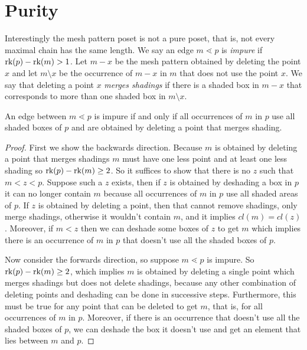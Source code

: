 \documentclass[11pt,a4paper,oneside]{article}
\begin{document}
\section{Purity}

Interestingly the mesh pattern poset is not a pure poset, that is, not every
maximal chain has the same length. We say an edge $m\lessdot p$ is \emph{impure}
if $\operatorname{\textrm{rk}}(p)-\operatorname{\textrm{rk}}(m)>1$. Let $m-x$ be the mesh pattern obtained by deleting the
point $x$ and let $m\setminus x$ be the occurrence of $m-x$ in $m$ that does not
use the point $x$. We say that deleting a point $x$ \emph{merges shadings} if
there is a shaded box in $m-x$ that corresponds to more than one shaded box in
$m\setminus x$.

\begin{lem}\label{lem:impureEdge}
An edge between $m\lessdot p$ is impure if and only if all occurrences of $m$ in
$p$ use all shaded boxes of $p$ and are obtained by deleting a point that merges
shading.
\begin{proof}
First we show the backwards direction. Because $m$ is obtained by deleting a
point that merges shadings $m$ must have one less point and at least one less
shading so $\operatorname{\textrm{rk}}(p)-\operatorname{\textrm{rk}}(m)\ge2$. So it suffices to show that there is no $z$ such
that $m<z<p$. Suppose such a $z$ exists, then if $z$ is obtained by deshading a
box in $p$ it can no longer contain $m$ because all occurrences of $m$ in $p$
use all shaded areas of $p$. If $z$ is obtained by deleting a point, then that
cannot remove shadings, only merge shadings, otherwise it wouldn't contain $m$,
and it implies $cl(m)=cl(z)$. Moreover, if $m<z$ then we can deshade some boxes
of $z$ to get $m$ which implies there is an occurrence of $m$ in $p$ that
doesn't use all the shaded boxes of $p$.

Now consider the forwards direction, so suppose $m\lessdot p$ is impure. So
$\operatorname{\textrm{rk}}(p)-\operatorname{\textrm{rk}}(m)\ge2$, which implies $m$ is obtained by deleting a single point
which merges shadings but does not delete shadings, because any other
combination of deleting points and deshading can be done in successive steps.
Furthermore, this must be true for any point that can be deleted to get $m$,
that is, for all occurrences of $m$ in $p$. Moreover, if there is an occurrence
that doesn't use all the shaded boxes of $p$, we can deshade the box it doesn't
use and get an element that lies between $m$ and $p$.
\end{proof}
\end{lem}
\end{document}
